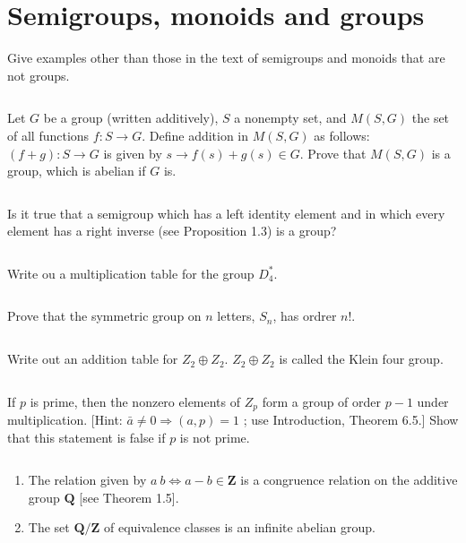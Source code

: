 \section{Semigroups, monoids and groups}
\begin{ex}
    Give examples other than those in the text of semigroups and monoids that are not groups.
\end{ex}

$$ $$

\begin{ex}
    Let $G$ be a group (written additively), $S$ a nonempty set, and $M(S,G)$ the set of all functions $f: S \rightarrow G$. Define addition in $M(S,G)$ as follows: $(f + g) : S \rightarrow G$ is given by $s \rightarrow f(s) + g(s) \in G$. Prove that $M(S,G)$ is a group, which is abelian if $G$ is.
\end{ex}

$$ $$

\begin{ex}
    Is it true that a semigroup which has a left identity element and in which every element has a right inverse (see Proposition 1.3) is a group?
\end{ex}

$$ $$

\begin{ex}
    Write ou a multiplication table for the group $D_4^*$.
\end{ex}

$$ $$

\begin{ex}
    Prove that the symmetric group on $n$ letters, $S_n$, has ordrer $n!$.
\end{ex}

$$ $$

\begin{ex}
    Write out an addition table for $Z_2\oplus Z_2$. $Z_2\oplus Z_2$ is called the Klein four group.
\end{ex}

$$ $$

\begin{ex}
    If $p$ is prime, then the nonzero elements of $Z_p$ form a group of order $p - 1$ under multiplication. [Hint: $\bar{a} \neq 0 \Rightarrow (a,p) = 1$ ; use Introduction, Theorem 6.5.] Show that this statement is false if $p$ is not prime.
\end{ex}

$$ $$

\begin{ex}
    \begin{enumerate}
        \item The relation given by $a ~ b \Leftrightarrow a - b \in \mathbf{Z}$ is a congruence relation on the additive group $\mathbf{Q}$ [see Theorem 1.5].
        \item The set $\mathbf{Q}/\mathbf{Z}$ of equivalence classes is an infinite abelian group.
    \end{enumerate}
\end{ex}

